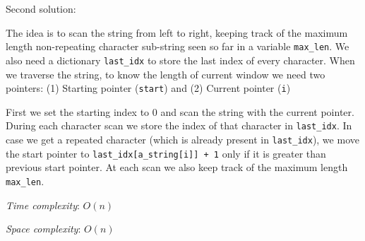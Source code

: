 \documentclass[a4paper,11pt]{book}
\begin{document}
\noindent Second solution: 

The idea is to scan the string from left to right, keeping track of the maximum length non-repeating character sub-string seen so far in a variable \lstinline{max_len}. We also need a dictionary \lstinline{last_idx} to store the last index of every character. When we traverse the string, to know the length of current window we need two pointers: (1) Starting pointer (\lstinline{start}) and (2) Current pointer (\lstinline{i})

First we set the starting index to 0 and scan the string with the current pointer. During each character scan we store the index of that character in \lstinline{last_idx}. In case we get a repeated character (which is already present in \lstinline{last_idx}), we move the start pointer to \lstinline{last_idx[a_string[i]] + 1} only if it is greater than previous start pointer. At each scan we also keep track of the maximum length \lstinline{max_len}.

\noindent \textit{Time complexity}: $O(n)$

\noindent \textit{Space complexity}: $O(n)$
\end{document}
